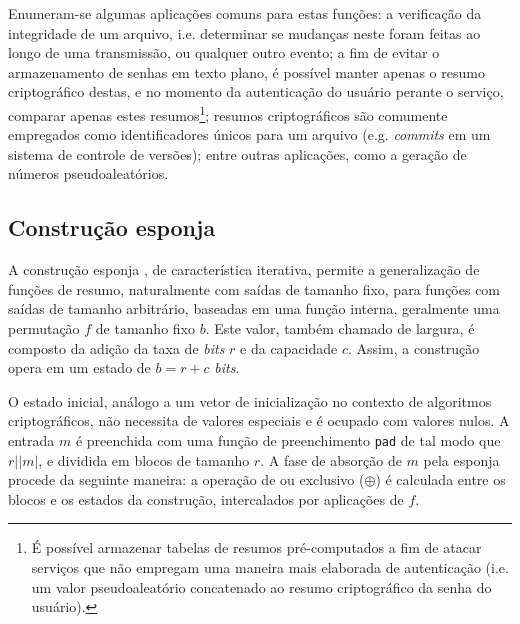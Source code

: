 \documentclass[12pt]{report}
\newcommand{\length}[1]{\vert #1 \vert}
\begin{document}
Enumeram-se algumas aplicações comuns para estas funções: a verificação da
integridade de um arquivo, i.e. determinar se mudanças neste foram feitas ao
longo de uma transmissão, ou qualquer outro evento; a fim de evitar o
armazenamento de senhas em texto plano, é possível manter apenas o resumo
criptográfico destas, e no momento da autenticação do usuário perante o
serviço, comparar apenas estes resumos\footnote{É possível armazenar tabelas de
resumos pré-computados a fim de atacar serviços que não empregam uma maneira
mais elaborada de autenticação (i.e. um valor pseudoaleatório
concatenado ao resumo criptográfico da senha do usuário).}; resumos
criptográficos são comumente empregados como identificadores únicos para um
arquivo (e.g. \emph{commits} em um sistema de controle de versões); entre
outras aplicações, como a geração de números pseudoaleatórios.

\subsection{Construção esponja}

A construção esponja \cite{SpongeReference}, de característica iterativa,
permite a generalização de funções de resumo, naturalmente com saídas de
tamanho fixo, para funções com saídas de tamanho arbitrário, baseadas em uma
função interna, geralmente uma permutação $f$ de tamanho fixo $b$. Este valor,
também chamado de largura, é composto da adição da taxa de \emph{bits} $r$ e da
capacidade $c$. Assim, a construção opera em um estado de $b = r + c$
\emph{bits}.

O estado inicial, análogo a um vetor de inicialização no contexto de algoritmos
criptográficos, não necessita de valores especiais e é ocupado com valores
nulos. A entrada $m$ é preenchida com uma função de preenchimento \texttt{pad}
de tal modo que $r \mid \length{m}$, e dividida em blocos de tamanho $r$. A
fase de absorção de $m$ pela esponja procede da seguinte maneira: a operação de
ou exclusivo ($\oplus$) é calculada entre os blocos e os estados da construção,
intercalados por aplicações de $f$.
\end{document}
